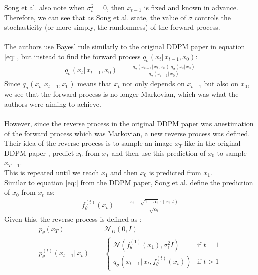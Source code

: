 \documentclass{article}
\begin{document}
Song et al. \cite{song2022denoising} also note when $\sigma_t^2 = 0$, then $x_{t-1}$ is fixed and known in advance. \\
Therefore, we can see that as Song et al. \cite{song2022denoising} state, the value of $\sigma$ controls the stochasticity (or more simply, the randomness) of the forward process.
\\\\
The authors use Bayes' rule similarly to the original DDPM paper \cite{ho2020denoising} in equation \ref{eq:}, but instead to find the forward process $q_\sigma(x_t | \, x_{t-1}, x_0)$:
\begin{align}
  q_{\sigma}(x_t | \, x_{t-1}, x_0) &= \frac{q_\sigma (x_{t-1} | \, x_t, x_0) \: q_\sigma (x_t | \, x_0)}{q_\sigma (x_{t-1} | \, x_0)}
\end{align}
Since $q_\sigma (x_t | \, x_{t-1}, x_0)$ means that $x_t$ not only depends on $x_{t-1}$ but also on $x_0$, we see that the forward process is no longer Markovian, which was what the authors were aiming to achieve. \cite{song2022denoising}
\\\\
However, since the reverse process in the original DDPM paper \cite{ho2020denoising} was anestimation of the forward process which was Markovian, a new reverse process was defined. \\
Their idea of the reverse process is to sample an image $x_T$ like in the original DDPM paper \cite{ho2020denoising}, predict $x_0$ from $x_T$ and then use this prediction of $x_0$ to sample $x_{T-1}$. \cite{song2022denoising} \\
This is repeated until we reach $x_1$ and then $x_0$ is predicted from $x_1$. \cite{song2022denoising} \\
Similar to equation \ref{eq:} from the DDPM paper, Song et al. \cite{song2022denoising} define the prediction of $x_0$ from $x_t$ as:
\begin{align}
  f_\theta^{(t)} (x_t) &= \frac{x_t - \sqrt{1 - \bar{\alpha}_t} \: \epsilon(x_t, t)}{\sqrt{\bar{\alpha}_t}}
\end{align}
Given this, the reverse process is defined as \cite{song2022denoising}:
\begin{align}
  p_\theta (x_T) &= \mathcal{N}_D(0, I) \\
  p_\theta^{(t)} (x_{t-1} | \, x_t) &= \begin{cases}
    \mathcal{N}(f_\theta^{(1)}(x_{1}), \sigma_1^2 I) & \text{if } t = 1 \\
    q_\sigma(x_{t-1} | \, x_t, f_\theta^{(t)}(x_t)) & \text{if } t > 1
  \end{cases}
\end{align}
\end{document}
